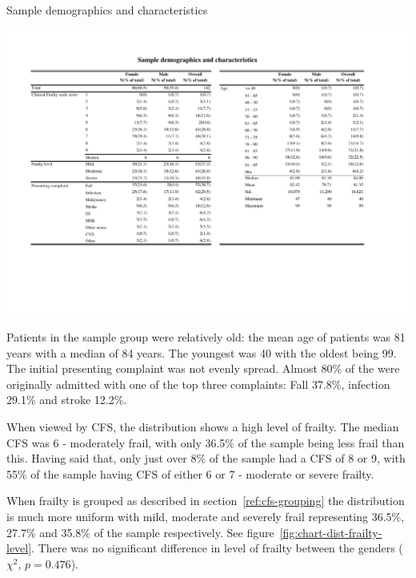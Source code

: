 \documentclass
[
	12pt,
	a4paper,
	oneside,
]{report}
\begin{document}
\begin{table}[p]
\caption{Sample demographics and characteristics}
\label{tab:dist-overall}
\includegraphics[width=\textwidth,
	trim={1.5cm 4cm 2.5cm 2cm},
	clip,
	angle=90,
	scale=1.45]{media/dist-overall}
\end{table}

Patients in the sample group were relatively old: the mean age of patients was 
81 years with a median of 84 years. The youngest was 40 with the oldest being 
99. 
The initial presenting complaint was not evenly spread. Almost 80\% of the
were originally admitted with one of the top three complaints: Fall 37.8\%, 
infection 29.1\% and stroke 12.2\%. 

When viewed by CFS, the distribution shows a high level of frailty. The median 
CFS was 6 - moderately frail, with only 36.5\% of the sample being less frail
than this. Having said that, only just over 8\% of the sample had a CFS of 8
or 9, with 55\% of the sample having CFS of either 6 or 7 - moderate or
severe frailty. 

When frailty is grouped as described in section~\ref{ref:cfs-grouping} the 
distribution is much more uniform with mild, moderate and severely frail
representing 36.5\%, 27.7\% and 35.8\% of the sample respectively.
See figure~\ref{fig:chart-dist-frailty-level}. There was no significant 
difference in level of frailty between the genders ($\chi^2$, $p=0.476$).
\label{sec:results-dist}
\end{document}
